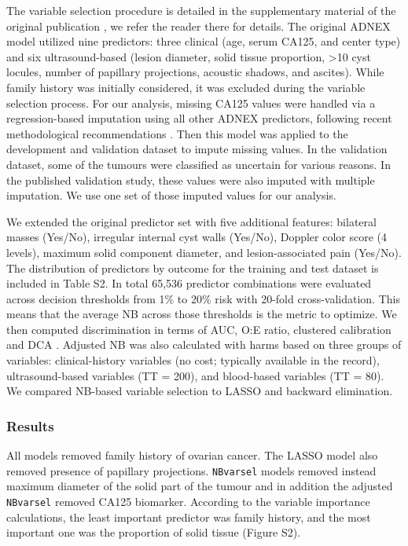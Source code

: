 The variable selection procedure is detailed in the supplementary material of the original publication \cite{vancalsterEvaluatingRiskOvarian2014}, we refer the reader there for details. The original \gls{ADNEX} model utilized nine predictors: three clinical (age, serum \gls{CA125}, and center type) and six ultrasound-based (lesion diameter, solid tissue proportion, >10 cyst locules, number of papillary projections, acoustic shadows, and ascites). While family history was initially considered, it was excluded during the variable selection process. For our analysis, missing \gls{CA125} values were handled via a regression-based imputation using all other \gls{ADNEX} predictors, following recent methodological recommendations \cite{siskImputationMissingIndicators2023}. Then this model was applied to the development and validation dataset to impute missing values. In the validation dataset, some of the tumours were classified as uncertain for various reasons. In the published validation study, these values were also imputed with multiple imputation. We use one set of those imputed values for our analysis.

We extended the original predictor set with five additional features: bilateral masses (Yes/No), irregular internal cyst walls (Yes/No), Doppler color score (4 levels), maximum solid component diameter, and lesion-associated pain (Yes/No). The distribution of predictors by outcome for the training and test dataset is included in Table S2. In total 65,536 predictor combinations were evaluated across decision thresholds from 1\% to 20\% risk with 20-fold cross-validation. This means that the average \gls{NB} across those thresholds is the metric to optimize. We then computed discrimination in terms of AUC, O:E ratio, clustered calibration and DCA \cite{barrenadaClusteredFlexibleCalibration2026}. Adjusted \gls{NB} was also calculated with harms based on three groups of variables: clinical-history variables (no cost; typically available in the record), ultrasound-based variables (TT = 200), and blood-based variables (TT = 80). We compared \gls{NB}-based variable selection to LASSO and backward elimination.

\subsubsection{Results}

All models removed family history of ovarian cancer. The LASSO model also removed presence of papillary projections. \texttt{NBvarsel} models removed instead maximum diameter of the solid part of the tumour and in addition the adjusted \texttt{NBvarsel} removed CA125 biomarker. According to the variable importance calculations, the least important predictor was family history, and the most important one was the proportion of solid tissue (Figure S2).

